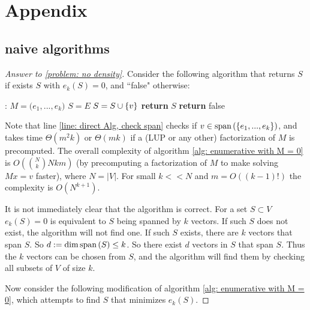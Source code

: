 \documentclass{article}
\begin{document}
\printbibliography

\section{Appendix}
\subsection{naive algorithms}
\begin{proof}[Answer to \ref{problem: no density}]
Consider the following algorithm that returns $S$ if exists $S$ with $e_k(S) = 0$, and ``false" otherwise:
\begin{algorithm}[H]
      \caption{}\label{alg: enumerative with M = 0}
    \begin{algorithmic}[1]
    :
        \State $M = \Big(e_1,...,e_k\Big)$
        \State $S = E$
            \label{line: direct Alg, check span}
                \State $S = S\cup \left\{v\right\}$
            \EndIf
        \EndFor
            \State \textbf{return} $S$
        \EndIf
    \EndFor
    \State \textbf{return} false
    \EndProcedure
    \end{algorithmic}
\end{algorithm}

Note that line \ref{line: direct Alg, check span} checks if $v\in \text{span}\left(\left\{e_1,...,e_k\right\}\right)$, and takes time $\Theta(m^2k)$ or $\Theta(mk)$ if a (LUP or any other) factorization of $M$ is precomputed. The overall complexity of algorithm \ref{alg: enumerative with M = 0} is $O(\binom{N}{k}Nkm)$ (by precomputing a factorization of $M$ to make solving $Mx=v$ faster), where $N = |V|$. For small $k<<N$ and $m = O((k-1)!)$ the complexity is $O(N^{k+1})$.

It is not immediately clear that the algorithm is correct. For a set $S\subset V$ $e_k(S)=0$ is equivalent to $S$ being spanned by $k$ vectors. If such $S$ does not exist, the algorithm will not find one. If such $S$ exists, there are $k$ vectors that span $S$. So $d := \dim \text{span}\left(S\right) \leq k$. So there exist $d$ vectors in $S$ that span $S$. Thus the $k$ vectors can be chosen from $S$, and the algorithm will find them by checking all subsets of $V$ of size $k$.

Now consider the following modification of algorithm \ref{alg: enumerative with M = 0}, which attempts to find $S$ that minimizes $e_k(S)$.


\end{proof}
\end{document}
